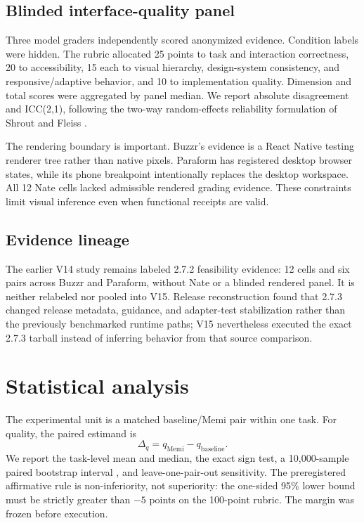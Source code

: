 \documentclass[9pt,twocolumn]{extarticle}
\begin{document}
\subsection{Blinded interface-quality panel}

Three model graders independently scored anonymized evidence. Condition labels
were hidden. The rubric allocated 25 points to task and interaction correctness,
20 to accessibility, 15 each to visual hierarchy, design-system consistency,
and responsive/adaptive behavior, and 10 to implementation quality. Dimension
and total scores were aggregated by panel median. We report absolute
disagreement and ICC(2,1), following the two-way random-effects reliability
formulation of Shrout and Fleiss \cite{shrout1979icc}.

The rendering boundary is important. Buzzr's evidence is a React Native testing
renderer tree rather than native pixels. Paraform has registered desktop
browser states, while its phone breakpoint intentionally replaces the desktop
workspace. All 12 Nate cells lacked admissible rendered grading evidence. These
constraints limit visual inference even when functional receipts are valid.

\subsection{Evidence lineage}

The earlier V14 study remains labeled 2.7.2 feasibility evidence: 12 cells and
six pairs across Buzzr and Paraform, without Nate or a blinded rendered panel.
It is neither relabeled nor pooled into V15. Release reconstruction found that
2.7.3 changed release metadata, guidance, and adapter-test stabilization rather
than the previously benchmarked runtime paths; V15 nevertheless executed the
exact 2.7.3 tarball instead of inferring behavior from that source comparison.

\section{Statistical analysis}

The experimental unit is a matched baseline/Memi pair within one task. For
quality, the paired estimand is
\begin{equation}
  \Delta_q = q_{\mathrm{Memi}} - q_{\mathrm{baseline}}.
\end{equation}
We report the task-level mean and median, the exact sign test, a 10,000-sample
paired bootstrap interval \cite{efron1993bootstrap}, and leave-one-pair-out
sensitivity. The preregistered affirmative rule is non-inferiority, not
superiority: the one-sided 95\% lower bound must be strictly greater than
$-5$ points on the 100-point rubric. The margin was frozen before execution.
\end{document}

